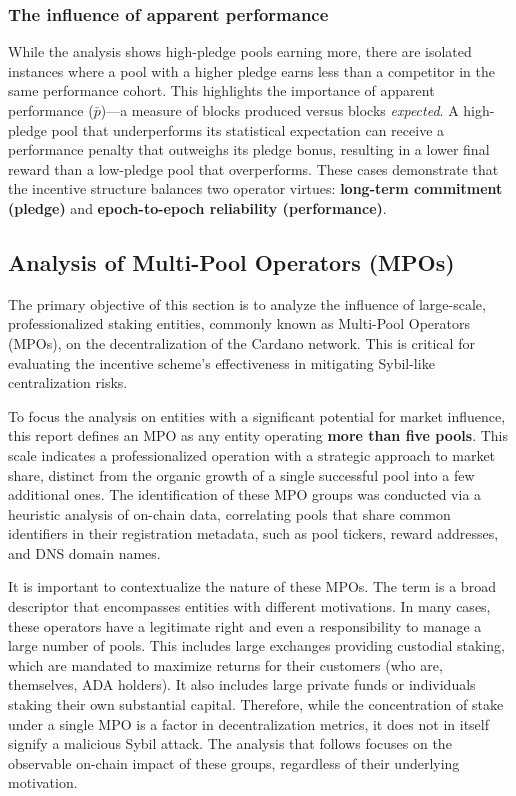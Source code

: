 \documentclass[11pt, letterpaper]{article}
\begin{document}
\subsubsection{The influence of apparent performance}
While the analysis shows high-pledge pools earning more, there are isolated
instances where a pool with a higher pledge earns less than a competitor in the
same performance cohort. This highlights the importance of apparent performance
($\bar{p}$)—a measure of blocks produced versus blocks \textit{expected}. A
high-pledge pool that underperforms its statistical expectation can receive a
performance penalty that outweighs its pledge bonus, resulting in a lower final
reward than a low-pledge pool that overperforms. These cases demonstrate that
the incentive structure balances two operator virtues: \textbf{long-term commitment (pledge)}
and \textbf{epoch-to-epoch reliability (performance)}.

\subsection{Analysis of Multi-Pool Operators (MPOs)}

The primary objective of this section is to analyze the influence of large-scale,
professionalized staking entities, commonly known as Multi-Pool Operators (MPOs), on
the decentralization of the Cardano network. This is critical for evaluating the incentive
scheme's effectiveness in mitigating Sybil-like centralization risks.

To focus the analysis on entities with a significant potential for market influence,
this report defines an MPO as any entity operating \textbf{more than five pools}. This scale
indicates a professionalized operation with a strategic approach to market share, distinct from the
organic growth of a single successful pool into a few additional ones. The identification of these MPO
groups was conducted via a heuristic analysis of on-chain data, correlating pools that share
common identifiers in their registration metadata, such as pool tickers, reward addresses, and DNS domain names.

It is important to contextualize the nature of these MPOs. The term is a broad descriptor that
encompasses entities with different motivations. In many cases, these operators have a legitimate
right and even a responsibility to manage a large number of pools. This includes large exchanges providing
custodial staking, which are mandated to maximize returns for their customers (who are, themselves, ADA holders).
It also includes large private funds or individuals staking their own substantial capital. Therefore,
while the concentration of stake under a single MPO is a factor in decentralization metrics, it does not
in itself signify a malicious Sybil attack. The analysis that follows focuses on the observable
on-chain impact of these groups, regardless of their underlying motivation.
\end{document}
